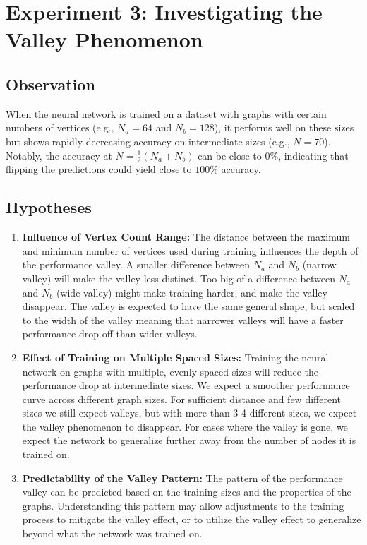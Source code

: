 \section{Experiment 3: Investigating the Valley Phenomenon}

\subsection{Observation}

When the neural network is trained on a dataset with graphs with certain numbers of vertices (e.g., $N_a = 64$ and $N_b = 128$), it performs well on these sizes but shows rapidly decreasing accuracy on intermediate sizes (e.g., $N = 70$). Notably, the accuracy at $N = \frac{1}{2} (N_a + N_b) $ can be close to $0\%$, indicating that flipping the predictions could yield close to $100\%$ accuracy. 



\subsection{Hypotheses}

\begin{enumerate}
    \item \textbf{Influence of Vertex Count Range:} The distance between the maximum and minimum number of vertices used during training influences the depth of the performance valley. A smaller difference between $N_a$ and $N_b$ (narrow valley) will make the valley less distinct. Too big of a difference between $N_a$ and $N_b$ (wide valley) might make training harder, and make the valley disappear. The valley is expected to have the same general shape, but scaled to the width of the valley meaning that narrower valleys will have a faster performance drop-off than wider valleys. 

    \item \textbf{Effect of Training on Multiple Spaced Sizes:} Training the neural network on graphs with multiple, evenly spaced sizes will reduce the performance drop at intermediate sizes. We expect a smoother performance curve across different graph sizes. For sufficient distance and few different sizes we still expect valleys, but with more than 3-4 different sizes, we expect the valley phenomenon to disappear. For cases where the valley is gone, we expect the network to generalize further away from the number of nodes it is trained on. 

    \item \textbf{Predictability of the Valley Pattern:} The pattern of the performance valley can be predicted based on the training sizes and the properties of the graphs. Understanding this pattern may allow adjustments to the training process to mitigate the valley effect, or to utilize the valley effect to generalize beyond what the network was trained on.
\end{enumerate}

